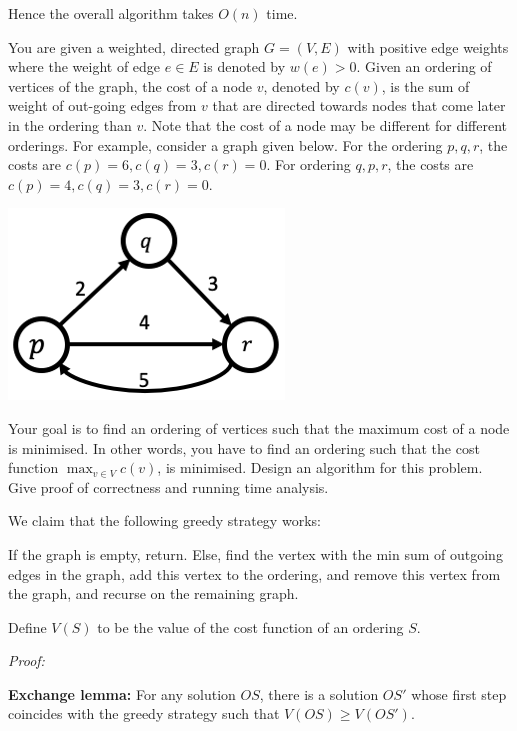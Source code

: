 \documentclass[answers]{exam}
\begin{document}
\begin{questions}
\begin{solution}
Hence the overall algorithm takes $O(n)$ time.

\end{solution}

\question[7]

You are given a weighted, directed graph $G = (V, E)$ with positive edge weights where the weight of edge $e \in E$ is denoted by $w(e) >0$. Given an ordering of vertices of the graph, the cost of a
node $v$, denoted by $c(v)$, is the sum of weight of out-going edges from $v$ that are directed towards nodes that come later in the ordering than $v$. Note that the cost of a node may be different
for different orderings. For example, consider a graph given below. For the ordering $p, q, r$, the costs are $c(p) = 6, c(q) = 3, c(r) = 0$. For ordering $q, p, r$, the costs are $c(p) = 4, c(q) = 3,
c(r) = 0$.

\begin{center}
    \includegraphics[scale=0.5]{major/order.png}
\end{center}

Your goal is to find an ordering of vertices such that the maximum cost of a node is minimised. In other words, you have to find an ordering such that the cost function $\max_{v \in V}{c(v)}$, is minimised. Design an algorithm for this problem. Give proof of correctness and running time analysis.

\begin{solution}
We claim that the following greedy strategy works:

If the graph is empty, return. Else, find the vertex with the min sum of outgoing edges in the graph, add this vertex to the ordering, and remove this vertex from the graph, and recurse on the
    remaining graph.

Define $V(S)$ to be the value of the cost function of an ordering $S$.

    \textit{Proof:}

    \textbf{Exchange lemma:} For any solution $OS$, there is a solution $OS'$ whose first step coincides with the greedy strategy such that $V(OS) \ge V(OS')$.


\end{solution}
\end{questions}
\end{document}
